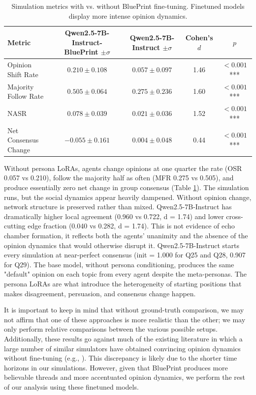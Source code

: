 \documentclass{article} %
\begin{document}
\begin{table}[h]
\centering
\begin{tabular}{lcccc}
\toprule
Metric 
& \makecell{Qwen2.5-7B-Instruct-\\BluePrint $\pm \sigma$} 
& \makecell{Qwen2.5-7B-\\Instruct $\pm \sigma$} 
& Cohen's $d$ 
& $p$ \\
\midrule
Opinion Shift Rate & $0.210 \pm 0.108$ & $0.057 \pm 0.097$ & 1.46 & $< 0.001$ *** \\
Majority Follow Rate & $0.505 \pm 0.064$ & $0.275 \pm 0.236$ & 1.60 & $< 0.001$ *** \\
NASR & $0.078 \pm 0.039$ & $0.021 \pm 0.036$ & 1.52 & $< 0.001$ *** \\
Net Consensus Change & $-0.055 \pm 0.161$ & $0.004 \pm 0.048$ & 0.44 & $< 0.001$ *** \\
\bottomrule
\end{tabular}
\caption{Simulation metrics with vs. without BluePrint fine-tuning. Finetuned models display more intense opinion dynamics.}
\label{tab:qwen_lora_comparison}
\end{table}

Without persona LoRAs, agents change opinions at one quarter the rate (OSR 0.057 vs 0.210), follow the majority half as often (MFR 0.275 vs 0.505), and produce essentially zero net change in group consensus (Table \ref{tab:qwen_lora_comparison}). The simulation runs, but the social dynamics appear heavily dampened. Without opinion change, network structure is preserved rather than mixed. Qwen2.5-7B-Instruct has dramatically higher local agreement (0.960 vs 0.722, d = 1.74) and lower cross-cutting edge fraction (0.040 vs 0.282, d = 1.74). This is not evidence of echo chamber formation, it reflects both the agents' unanimity and the absence of the opinion dynamics that would otherwise disrupt it. 
Qwen2.5-7B-Instruct starts every simulation at near-perfect consensus (init = 1.000 for Q25 and Q28, 0.907 for Q29).
The base model, without persona conditioning, produces the same "default" opinion on each topic from every agent despite the meta-personas. The persona LoRAs are what introduce the heterogeneity of starting positions that makes disagreement, persuasion, and consensus change happen.

It is important to keep in mind that without ground-truth comparison, we may not affirm that one of these approaches is more realistic than the other; we may only perform relative comparisons between the various possible setups. Additionally, these results go against much of the existing literature in which a large number of similar simulators have obtained convincing opinion dynamics without fine-tuning (e.g., \cite{yang2025oasisopenagentsocial}). This discrepancy is likely due to the shorter time horizons in our simulations. However, given that BluePrint produces more believable threads and more accentuated opinion dynamics, we perform the rest of our analysis using these finetuned models.
\end{document}
